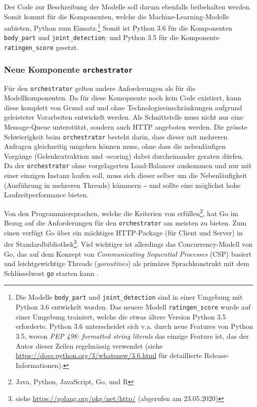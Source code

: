 Der Code zur Beschreibung der Modelle soll darum ebenfalls beibehalten werden. Somit kommt für die Komponenten, welche die Machine-Learning-Modelle anbieten, Python zum Einsatz.\footnote{Die Modelle \texttt{body\_part} und \texttt{joint\_detection} sind in einer Umgebung mit Python 3.6 entwickelt worden. Das neuere Modell \texttt{ratingen\_score} wurde auf einer Umgebung trainiert, welche die etwas ältere Version Python 3.5 erforderte. Python 3.6 unterscheidet sich v.a. durch neue Features von Python 3.5, wovon \textit{PEP 498: formatted string literals} das einzige Feature ist, das der Autor dieser Zeilen regelmässig verwendet (siehe \url{https://docs.python.org/3/whatsnew/3.6.html} für detaillierte Release-Informationen).} Somit ist Python 3.6 für die Komponenten \texttt{body\_part} und \texttt{joint\_detection}; und Python 3.5 für die Komponente \texttt{ratingen\_score} gesetzt.

\subsubsection{Neue Komponente \texttt{orchestrator}}
\label{sec:wahl-der-programmiersprache-orchestrator}

Für den \texttt{orchestrator} gelten andere Anforderungen als für die Modellkomponenten. Da für diese Komopnente noch kein Code existiert, kann diese komplett von Grund auf und ohne Technologieeinschränkungen aufgrund geleisteter Vorarbeiten entwickelt werden. Als Schnittstelle muss nicht nur eine Message-Queue unterstützt, sondern auch HTTP angeboten werden. Die grösste Schwierigkeit beim \texttt{orchestrator} besteht darin, dass dieser mit mehreren Anfragen gleichzeitig umgehen können muss, ohne dass die nebenläufigen Vorgänge (Gelenkextraktion und -scoring) dabei durcheinander geraten dürfen. Da der \texttt{orchestrator} ohne vorgelagerten Load-Balancer auskommen und nur mit einer einzigen Instanz laufen soll, muss sich dieser selber um die Nebenläufigkeit (Ausführung in mehreren Threads) kümmern ‒ und sollte eine möglichst hohe Laufzeitperformance bieten.

Von den Programmiersprachen, welche die Kriterien von  erfüllen\footnote{Java, Python, JavaScript, Go, und R}, hat Go im Bezug auf die Anforderungen für den \texttt{orchestrator} am meisten zu bieten. Zum einen verfügt Go über ein mächtiges HTTP-Package (für Client und Server) in der Standardbibliothek\footnote{siehe \url{https://golang.org/pkg/net/http/} (abgerufen am 23.05.2020)}. Viel wichtiger ist allerdings das Concurrency-Modell von Go, das auf dem Konzept von \textit{Communicating Sequential Processes} (CSP) basiert und leichtgewichtige Threads (\textit{goroutines}) als primäres Sprachkonstrukt mit dem Schlüsselwort \texttt{go} starten kann \cite[Kapitel 8]{gopl}. 

